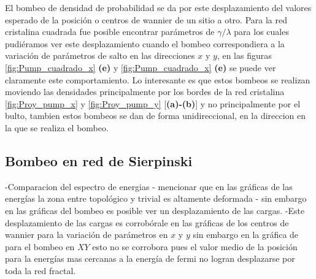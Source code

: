 El bombeo de densidad de probabilidad se da por este desplazamiento del valores esperado de la posición o centros de wannier de un sitio a otro. Para la red cristalina cuadrada fue posible encontrar parámetros de $\gamma/\lambda$ para los cuales pudiéramos ver este desplazamiento cuando el bombeo correspondiera a la variación de parámetros de salto en las direcciones $x$ y $y$, en las figuras \ref{fig:Pump_cuadrado_x} \textbf{(e)} y \ref{fig:Pump_cuadrado_x} \textbf{(e)} se puede ver claramente este comportamiento. Lo interesante es que estos bombeos se realizan moviendo las densidades principalmente por los bordes de la red cristalina \ref{fig:Proy_pump_x} y \ref{fig:Proy_pump_y} [\textbf{(a)-(b)}] y no principalmente por el bulto, tambien estos bombeos se dan de forma unidireccional, en la direccion en la que se realiza el bombeo.




















\subsection{Bombeo en red de Sierpinski}
-Comparacion del espectro de energias
- mencionar que en las gráficas de las energías la zona entre topológico y trivial es altamente deformada 
- sin embargo en las gráficas del bombeo es posible ver un desplazamiento de las cargas.
-Este desplazamiento de las cargas es corrobórale en las gráficas de los centros de wannier para la variación de parámetros en $x$ y $y$ sin embargo en la gráfica de para el bombeo en $XY$ esto no se corrobora pues el valor medio de la posición para la energías mas cercanas a la energía de fermi no logran desplazarse por toda la red fractal. 



















